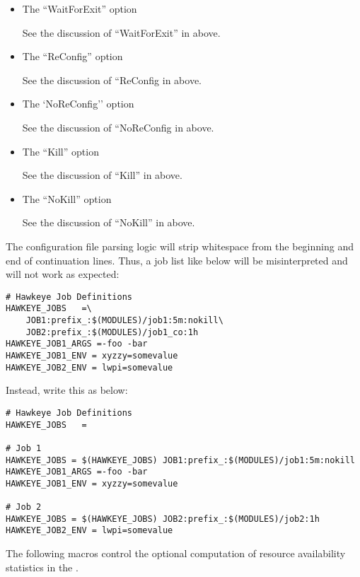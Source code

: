 \begin{description}
\begin{itemize}
\begin{itemize}
	\item The ``WaitForExit'' option

	See the discussion of ``WaitForExit'' in
	 above.

	\item The ``ReConfig'' option

	See the discussion of ``ReConfig in
	 above.

	\item The `NoReConfig'' option

	See the discussion of ``NoReConfig in
	 above.

	\item The ``Kill'' option

	See the discussion of ``Kill'' in
	 above.

	\item The ``NoKill'' option

	See the discussion of ``NoKill'' in
	 above.

    \end{itemize}
	
  \end{itemize}
\Note The configuration file parsing logic will strip whitespace from
the beginning and end of continuation lines.  Thus, a job list like
below will be misinterpreted and will not work as expected:
\begin{verbatim}
# Hawkeye Job Definitions
HAWKEYE_JOBS   =\
    JOB1:prefix_:$(MODULES)/job1:5m:nokill\
    JOB2:prefix_:$(MODULES)/job1_co:1h
HAWKEYE_JOB1_ARGS =-foo -bar
HAWKEYE_JOB1_ENV = xyzzy=somevalue
HAWKEYE_JOB2_ENV = lwpi=somevalue
\end{verbatim}
Instead, write this as below:
\begin{verbatim}
# Hawkeye Job Definitions
HAWKEYE_JOBS   =

# Job 1
HAWKEYE_JOBS = $(HAWKEYE_JOBS) JOB1:prefix_:$(MODULES)/job1:5m:nokill
HAWKEYE_JOB1_ARGS =-foo -bar
HAWKEYE_JOB1_ENV = xyzzy=somevalue

# Job 2
HAWKEYE_JOBS = $(HAWKEYE_JOBS) JOB2:prefix_:$(MODULES)/job2:1h
HAWKEYE_JOB2_ENV = lwpi=somevalue
\end{verbatim}


\end{description}

The following macros control the optional computation of resource
availability statistics in the .

